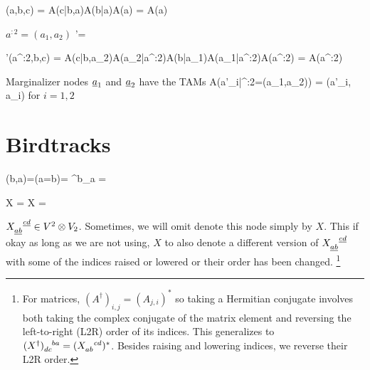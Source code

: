 \beq
\calq(a,b,c)
=
A(c|b,a)A(b|a)A(a)
=
\bcen
{}
\ecen
A(a)
\eeq

$a^{:2} = (a_1, a_2)$
\beq
\calq'=
\bcen
{}
\ecen
\eeq

\beq
\calq'(a^{:2},b,c)
=
A(c|b,a_2)A(a_2|a^{:2})A(b|a_1)A(a_1|a^{:2})A(a^{:2})
=
\bcen
{}
\ecen
A(a^{:2})
\eeq

Marginalizer nodes  $\rva_1$ and $\rva_2$
have the TAMs
\beq \color{blue}
A(a'_i|\rva^{:2}=(a_1,a_2)) = \delta(a'_i, a_i)
\eeq
for $i=1,2$

\section{Birdtracks}



\beq
\delta(b,a)=\indi(a=b)=
\delta^b_a =
\eeq


\beq
{}
X\indices{_\rva_\rvb^\rvc^\rvd}
=
X
=
\bcen
{}\ecen
\eeq

\beq
\bcen
{}\ecen
\rarrow
\bcen
{}\ecen
\eeq
$X\indices{_\rva_\rvb^\rvc^\rvd}\in V^2 \otimes V_2$.
Sometimes, 
we will omit denote
this node simply by $X$.
This if okay as long as
we are not using,
$X$ to also denote
a different version of $X\indices{_\rva_\rvb^\rvc^\rvd}$
with some of the indices
raised or lowered or 
their order has been changed.
\footnote{For matrices,
$(A^\dagger)_{i,j} = (A_{j, i})^*$
so
taking a Hermitian conjugate
involves both taking
the complex conjugate of
the matrix element and reversing the left-to-right (L2R) order of its indices.
This generalizes to 
$(X^\dagger)\indices{_d_c^b^a}=
(X\indices{_a_b^c^d})^*$.
Besides raising and lowering indices, we reverse their L2R order.
}

